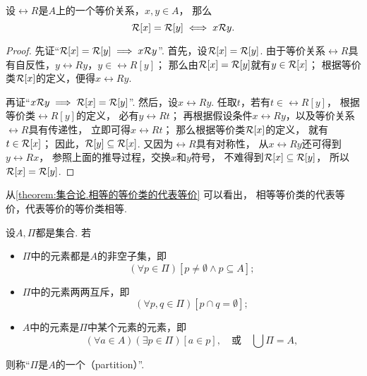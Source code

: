 \begin{lemma}\label{theorem:集合论.相等的等价类的代表等价}
设\(\rel{R}\)是\(A\)上的一个等价关系，\(x,y \in A\)，
那么\begin{equation*}
	\EquivalenceClassBH{x}[\rel{R}] = \rel{R}[y]
	\iff
	x \rel{R} y.
\end{equation*}
\begin{proof}
先证“\(
	\EquivalenceClassBH{x}[\rel{R}] = \EquivalenceClassBH{y}[\rel{R}]
	\implies
	x \rel{R} y
\)”.
首先，设\(\EquivalenceClassBH{x}[\rel{R}] = \rel{R}[y]\).
由于等价关系\(\rel{R}\)具有自反性，\(y \rel{R} y\)，\(y \in \rel{R}[y]\)；
那么由\(\EquivalenceClassBH{x}[\rel{R}] = \rel{R}[y]\)就有\(y \in \EquivalenceClassBH{x}[\rel{R}]\)；
根据等价类\(\EquivalenceClassBH{x}[\rel{R}]\)的定义，便得\(x \rel{R} y\).

再证“\(
	x \rel{R} y
	\implies
	\EquivalenceClassBH{x}[\rel{R}] = \EquivalenceClassBH{y}[\rel{R}]
\)”.
然后，设\(x \rel{R} y\).
任取\(t\)，若有\(t \in \rel{R}[y]\)，
根据等价类\(\rel{R}[y]\)的定义，
必有\(y \rel{R} t\)；
再根据假设条件\(x \rel{R} y\)，以及等价关系\(\rel{R}\)具有传递性，
立即可得\(x \rel{R} t\)；
那么根据等价类\(\EquivalenceClassBH{x}[\rel{R}]\)的定义，
就有\(t \in \EquivalenceClassBH{x}[\rel{R}]\)；
因此，\(\rel{R}[y] \subseteq \EquivalenceClassBH{x}[\rel{R}]\).
又因为\(\rel{R}\)具有对称性，
从\(x \rel{R} y\)还可得到\(y \rel{R} x\)，
参照上面的推导过程，交换\(x\)和\(y\)符号，
不难得到\(\EquivalenceClassBH{x}[\rel{R}] \subseteq \rel{R}[y]\)，
所以\(\EquivalenceClassBH{x}[\rel{R}] = \rel{R}[y]\).
\end{proof}
\end{lemma}
从\cref{theorem:集合论.相等的等价类的代表等价} 可以看出，
相等等价类的代表等价，代表等价的等价类相等.

\begin{definition}\label{definition:集合论.划分的定义}
设\(A,\Pi\)都是集合.
若\begin{itemize}
	\item \(\Pi\)中的元素都是\(A\)的非空子集，即\begin{equation*}
		(\forall p \in \Pi)
		[
			p \neq \emptyset
			\land
			p \subseteq A
		];
	\end{equation*}

	\item \(\Pi\)中的元素两两互斥，即\begin{equation*}
		(\forall p,q \in \Pi)
		[
			p \cap q = \emptyset
		];
	\end{equation*}

	\item \(A\)中的元素是\(\Pi\)中某个元素的元素，即\begin{equation*}
		(\forall a \in A)
		(\exists p \in \Pi)
		[
			a \in p
		],
		\quad\text{或}\quad
		\bigcup\Pi = A,
	\end{equation*}
\end{itemize}
则称“\(\Pi\)是\(A\)的一个（partition）”.
\end{definition}

